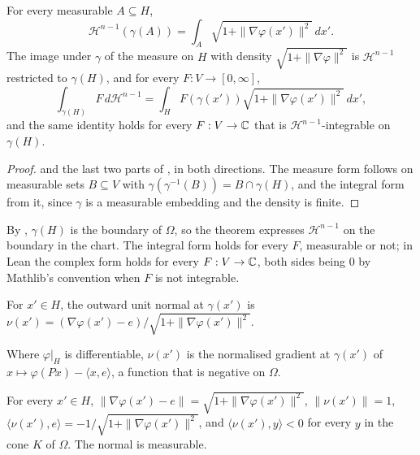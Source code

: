 \begin{theorem}
\label{thm:lipschitz-graph-area}
\leanok
{}
For every measurable $A \subseteq H$,
\[
  \mathcal H^{n-1}(\gamma(A)) = \int_A \sqrt{1 + \|\nabla\varphi(x')\|^2} \, dx' .
\]
The image under $\gamma$ of the measure on $H$ with density $\sqrt{1 + \|\nabla\varphi\|^2}$ is
$\mathcal H^{n-1}$ restricted to $\gamma(H)$, and for every $F : V \to [0, \infty]$,
\[
  \int_{\gamma(H)} F \, d\mathcal H^{n-1}
  = \int_H F(\gamma(x')) \sqrt{1 + \|\nabla\varphi(x')\|^2} \, dx' ,
\]
and the same identity holds for every $F : V \to \mathbb{C}$ that is $\mathcal H^{n-1}$-integrable on
$\gamma(H)$.
\end{theorem}

\begin{proof}
\leanok
{} and the last two parts of , in both
directions. The measure form follows on measurable sets $B \subseteq V$ with
$\gamma(\gamma^{-1}(B)) = B \cap \gamma(H)$, and the integral form from it, since $\gamma$ is a
measurable embedding and the density is finite.
\end{proof}

By , $\gamma(H)$ is the boundary of $\Omega$, so the theorem expresses
$\mathcal H^{n-1}$ on the boundary in the chart. The integral form holds for every $F$,
measurable or not; in Lean the complex form holds for every $F : V \to \mathbb{C}$, both sides being $0$
by Mathlib's convention when $F$ is not integrable.

\begin{definition}
\label{def:graph-normal}
\leanok
{}
For $x' \in H$, the outward unit normal at $\gamma(x')$ is
$\nu(x') = (\nabla\varphi(x') - e)/\sqrt{1 + \|\nabla\varphi(x')\|^2}$.
\end{definition}

Where $\varphi|_H$ is differentiable, $\nu(x')$ is the normalised gradient at $\gamma(x')$ of
$x \mapsto \varphi(Px) - \langle x, e \rangle$, a function that is negative on $\Omega$.

\begin{lemma}
\label{lem:graph-normal}
\leanok
{}
For every $x' \in H$, $\|\nabla\varphi(x') - e\| = \sqrt{1 + \|\nabla\varphi(x')\|^2}$,
$\|\nu(x')\| = 1$, $\langle \nu(x'), e \rangle = -1/\sqrt{1 + \|\nabla\varphi(x')\|^2}$, and
$\langle \nu(x'), y \rangle < 0$ for every $y$ in the cone $K$ of $\Omega$. The normal is
measurable.
\end{lemma}

